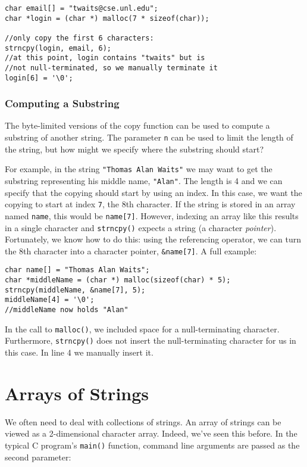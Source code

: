 \begin{verbatim}
char email[] = "twaits@cse.unl.edu";
char *login = (char *) malloc(7 * sizeof(char));

//only copy the first 6 characters:
strncpy(login, email, 6);
//at this point, login contains "twaits" but is
//not null-terminated, so we manually terminate it
login[6] = '\0';
\end{verbatim}

\subsubsection{Computing a Substring}

The byte-limited versions of the copy function can
be used to compute a substring of another string.
The parameter \texttt{n} can be used to limit
the length of the string, but how might we specify
where the substring should start?  

For example, in the string \texttt{"Thomas Alan Waits"}
we may want to get the substring representing his
middle name, \texttt{"Alan"}.  The length
is 4 and we can specify that the copying should start by 
using an index.  In this case, we want the copying to
start at index \texttt{7}, the 8th character.  
If the string is stored in an array named \texttt{name}, 
this would be \texttt{name[7]}.  However, indexing
an array like this results in a single character and
\texttt{strncpy()} expects a string (a 
character \emph{pointer}).  Fortunately, we know how
to do this: using the referencing operator, we can
turn the 8th character into a character pointer, 
\texttt{&name[7]}.  A full example:

\begin{verbatim}
char name[] = "Thomas Alan Waits";
char *middleName = (char *) malloc(sizeof(char) * 5);
strncpy(middleName, &name[7], 5);
middleName[4] = '\0';
//middleName now holds "Alan"
\end{verbatim}

In the call to \texttt{malloc()}, we included space
for a null-terminating character.  Furthermore, \texttt{strncpy()}
does not insert the null-terminating character for us in this case.
In line 4 we manually insert it.

\section{Arrays of Strings}

We often need to deal with collections of strings.  An
array of strings can be viewed as a 2-dimensional 
character array.  Indeed, we've seen this before.  In
the typical C program's \texttt{main()} function, 
command line arguments are passed as the second
parameter:

